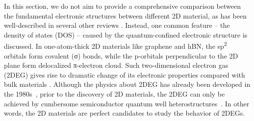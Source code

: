 %
In this section, we do not aim to provide a comprehensive comparison
between the fundamental electronic structures between different 2D
material, as has been well-described in several other reviews
\cite{Neto_2009_Electron_gr_rev,Mas_Ballest_2011_review,Das_Sarma_2011_electron_gr,Butler_2013_review,Bhimanapati_2015_2D_rev,Novoselov_2016_vdW}.
%
Instead, one common feature -- the density of states (DOS) -- caused
by the quantum-confined electronic structure is discussed.
%
In
one-atom-thick 2D materials like graphene and hBN, the
sp\textsuperscript{2} orbitals form covalent (σ) bonds, while the
p-orbitals perpendicular to the 2D plane form delocalized π-electron
cloud\nocite{Ihn_2009_book}.
%
Such two-dimensional
electron gas (2DEG) gives rise to dramatic change of its electronic
properties compared with bulk materials \cite{Davies_1997_book}.
%
Although the physics about 2DEG has already been developed in the
1980s~\cite{Ando_1982_electron_2D}, prior to the discovery of 2D
materials, the 2DEG can only be achieved by cumbersome semiconductor
quantum well
heterostructures~\cite{Ihn_2009_book,Davies_1997_book}. In other
words, the 2D materials are perfect candidates to study the behavior
of 2DEGs.


